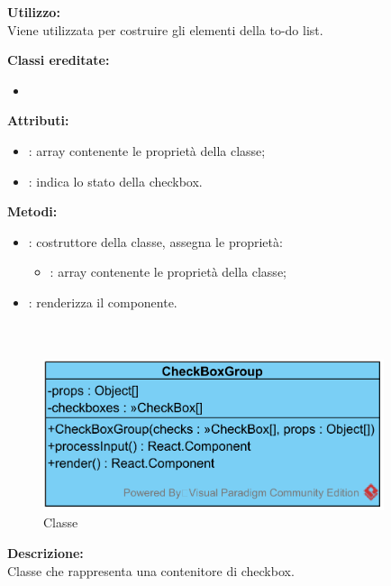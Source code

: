\textbf{Utilizzo:}\\
Viene utilizzata per costruire gli elementi della to-do list.

\textbf{Classi ereditate:}
\begin{itemize}
	\item {}
\end{itemize}


\textbf{Attributi:}
\begin{itemize}
	\item {}: array contenente le proprietà della classe;
	\item {}: indica lo stato della checkbox.
\end{itemize}

\textbf{Metodi:}
\begin{itemize}
	\item {}: costruttore della classe, assegna le proprietà:
	\begin{itemize}
		\item {}: array contenente le proprietà della classe;
	\end{itemize}
	\item {}: renderizza il componente.
\end{itemize}

\paragraph[::CheckBoxGroup]{\class}\mbox{}\\ \label{\class}
\begin{figure}[H]
	\centering
	\includegraphics[width=10cm]{./diagrammi/framework/view/gui/checkboxgroup.png}
	\caption{Classe \class}
\end{figure}
\textbf{Descrizione:}\\
Classe che rappresenta una contenitore di checkbox.

